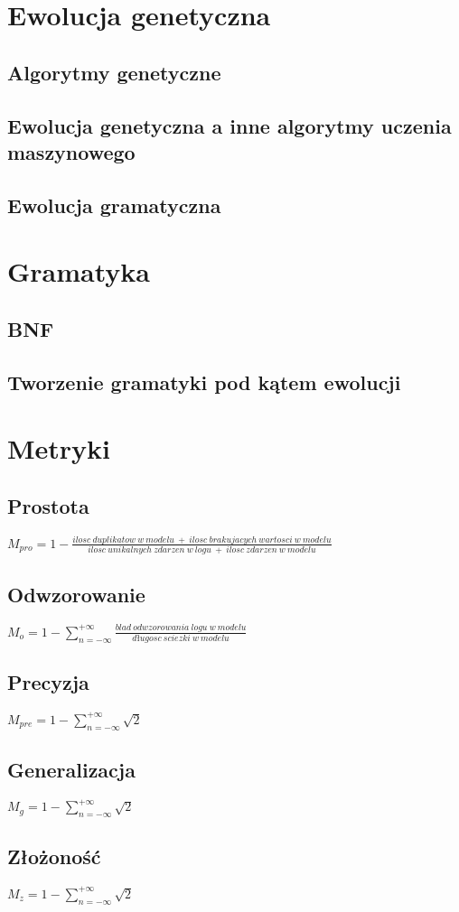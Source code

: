 \section{Ewolucja genetyczna}
\label{sec:ewolucjaGenetyczne}
\subsection{Algorytmy genetyczne}
\cite{10.5555/138936}
\subsection{Ewolucja genetyczna a inne algorytmy uczenia maszynowego}
\subsection{Ewolucja gramatyczna}


\section{Gramatyka}
\label{sec:gramatyka}
\subsection{BNF}
\subsection{Tworzenie gramatyki pod kątem ewolucji}


\section{Metryki}
\label{sec:metryki}
\cite{doi:10.1142/S0218843014400012}
\subsection{Prostota}
$M_{pro} = 1 - \frac{ilosc\ duplikatow\ w\ modelu\ +\ ilosc\ brakujacych\ wartosci\ w\ modelu}{ilosc\ unikalnych\ zdarzen\ w\ logu\ +\ ilosc\ zdarzen\ w\ modelu}$
\subsection{Odwzorowanie}
$M_o = 1 - \sum_{n=-\infty}^{+\infty} \frac{blad\ odwzorowania\ logu\ w\ modelu}{długosc\ sciezki\ w\ modelu}  $
\subsection{Precyzja}
$M_{pre} = 1 - \sum_{n=-\infty}^{+\infty} \sqrt{2} $
\subsection{Generalizacja}
$M_g = 1 - \sum_{n=-\infty}^{+\infty} \sqrt{2} $
\subsection{Złożoność}
$M_z = 1 - \sum_{n=-\infty}^{+\infty} \sqrt{2} $
